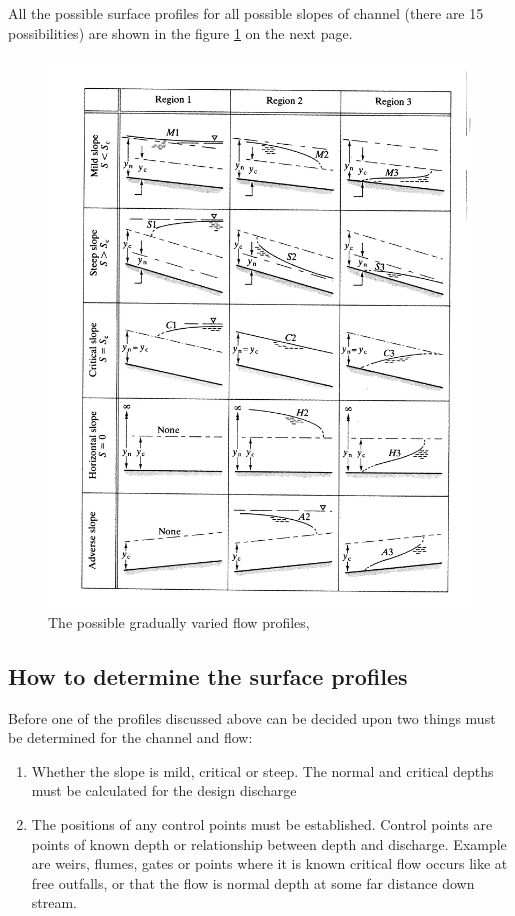 \documentclass[a4paper, 12pt, british]{article} %
\numberwithin{equation}{section}
\numberwithin{figure}{section}
\numberwithin{table}{section}
\begin{document}
All the possible surface profiles for all possible slopes of channel (there are 15 possibilities) are shown in the figure \ref{fig:1153} on the next page.
 

    \begin{figure}[p]
	\centering
	\includegraphics[scale=0.2,angle=0.5]{./images/fig_1153.png}
	\caption{The possible gradually varied flow profiles, \cite{chadwick}}
	\label{fig:1153}
\end{figure}   
 
\subsection{How to determine the surface profiles}

Before one of the profiles discussed above can be decided upon two things must be determined for the channel and flow:
\begin{enumerate}[label=\alph*]
	\item Whether the slope is mild, critical or steep. The normal and critical depths must be calculated for the design discharge
\item The positions of any control points must be established. Control points are points of known depth or relationship between depth and discharge. Example are weirs, flumes, gates or points where it is known critical flow occurs like at free outfalls, or that the flow is normal depth at some far distance down stream.
\end{enumerate}
\end{document}
